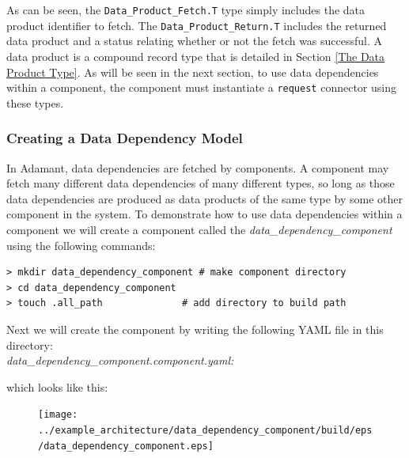 


As can be seen, the \texttt{Data\_Product\_Fetch.T} type simply includes the data product identifier to fetch. The \texttt{Data\_Product\_Return.T} includes the returned data product and a status relating whether or not the fetch was successful. A data product is a compound record type that is detailed in Section \ref{The Data Product Type}. As will be seen in the next section, to use data dependencies within a component, the component must instantiate a \texttt{request} connector using these types.

\subsubsection{Creating a Data Dependency Model}

In Adamant, data dependencies are fetched by components. A component may fetch many different data dependencies of many different types, so long as those data dependencies are produced as data products of the same type by some other component in the system. To demonstrate how to use data dependencies within a component we will create a component called the \textit{data\_dependency\_component} using the following commands:

\vspace{5mm} %
\begin{verbatim}
> mkdir data_dependency_component # make component directory
> cd data_dependency_component 
> touch .all_path              # add directory to build path
\end{verbatim}
\vspace{5mm} %

Next we will create the component by writing the following YAML file in this directory: \\

\textit{data\_dependency\_component.component.yaml:}

which looks like this:

\begin{figure}[H]
  \texttt{[image: ../example\_architecture/data\_dependency\_component/build/eps/data\_dependency\_component.eps]}
\end{figure}

